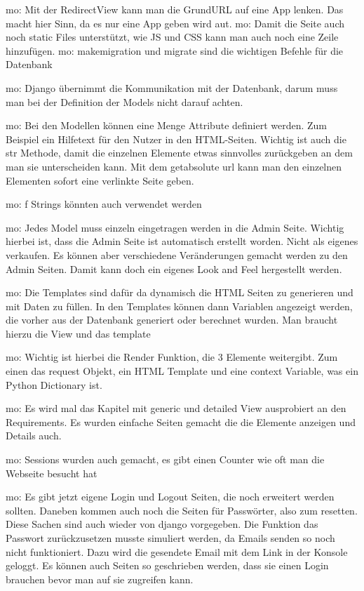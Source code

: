 \documentclass[11pt,a4paper]{report}
\begin{document}
mo: Mit der RedirectView kann man die GrundURL auf eine App lenken. Das macht hier Sinn, da es nur eine App geben wird aut.
mo: Damit die Seite auch noch static Files unterstützt, wie JS und CSS kann man auch noch eine Zeile hinzufügen.
mo: makemigration und migrate sind die wichtigen Befehle für die Datenbank 

mo: Django übernimmt die Kommunikation mit der Datenbank, darum muss man bei der Definition der Models nicht darauf achten.

mo: Bei den Modellen können eine Menge Attribute definiert werden. Zum Beispiel ein Hilfetext für den Nutzer in den HTML-Seiten. Wichtig ist auch die str Methode, damit die einzelnen Elemente etwas sinnvolles zurückgeben an dem man sie unterscheiden kann. Mit dem getabsolute url kann man den einzelnen Elementen sofort eine verlinkte Seite geben.

mo: f Strings könnten auch verwendet werden

mo: Jedes Model muss einzeln eingetragen werden in die Admin Seite. Wichtig hierbei ist, dass die Admin Seite ist automatisch erstellt worden. Nicht als eigenes verkaufen. Es können aber verschiedene Veränderungen gemacht werden zu den Admin Seiten. Damit kann doch ein eigenes Look and Feel hergestellt werden. 

mo: Die Templates sind dafür da dynamisch die HTML Seiten zu generieren und mit Daten zu füllen. In den Templates können dann Variablen angezeigt werden, die vorher aus der Datenbank generiert oder berechnet wurden. Man braucht hierzu die View und das template

mo: Wichtig ist hierbei die Render Funktion, die 3 Elemente weitergibt. Zum einen das request Objekt, ein HTML Template und eine context Variable, was ein Python Dictionary ist. 

mo: Es wird mal das Kapitel mit generic und detailed View ausprobiert an den Requirements. Es wurden einfache Seiten gemacht die die Elemente anzeigen und Details auch.

mo: Sessions wurden auch gemacht, es gibt einen Counter wie oft man die Webseite besucht hat

mo: Es gibt jetzt eigene Login und Logout Seiten, die noch erweitert werden sollten. Daneben kommen auch noch die Seiten für Passwörter, also zum resetten. Diese Sachen sind auch wieder von django vorgegeben. Die Funktion das Passwort zurückzusetzen musste simuliert werden, da Emails senden so noch nicht funktioniert. Dazu wird die gesendete Email mit dem Link in der Konsole geloggt. Es können auch Seiten so geschrieben werden, dass sie einen Login brauchen bevor man auf sie zugreifen kann.
\end{document}
